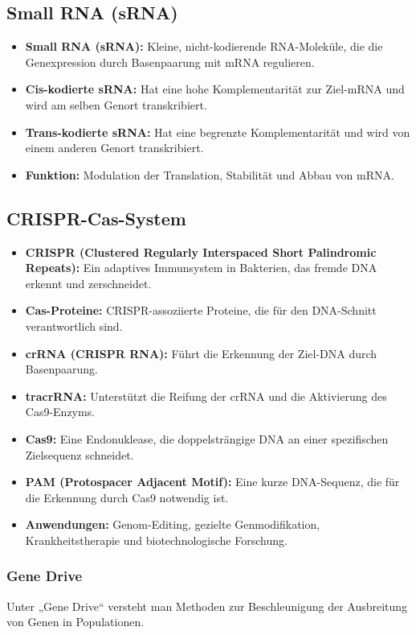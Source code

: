 \subsection{Small RNA (sRNA)}
\begin{itemize}
    \item \textbf{Small RNA (sRNA):} Kleine, nicht-kodierende RNA-Moleküle, die die Genexpression durch Basenpaarung mit mRNA regulieren.
    \item \textbf{Cis-kodierte sRNA:} Hat eine hohe Komplementarität zur Ziel-mRNA und wird am selben Genort transkribiert.
    \item \textbf{Trans-kodierte sRNA:} Hat eine begrenzte Komplementarität und wird von einem anderen Genort transkribiert.
    \item \textbf{Funktion:} Modulation der Translation, Stabilität und Abbau von mRNA. 
\end{itemize}
\subsection{CRISPR-Cas-System} 
\begin{itemize}
    \item \textbf{CRISPR (Clustered Regularly Interspaced Short Palindromic Repeats):} Ein adaptives Immunsystem in Bakterien, das fremde DNA erkennt und zerschneidet.
    \item \textbf{Cas-Proteine:} CRISPR-assoziierte Proteine, die für den DNA-Schnitt verantwortlich sind.
    \item \textbf{crRNA (CRISPR RNA):} Führt die Erkennung der Ziel-DNA durch Basenpaarung.
    \item \textbf{tracrRNA:} Unterstützt die Reifung der crRNA und die Aktivierung des Cas9-Enzyms.
    \item \textbf{Cas9:} Eine Endonuklease, die doppelsträngige DNA an einer spezifischen Zielsequenz schneidet.
    \item \textbf{PAM (Protospacer Adjacent Motif):} Eine kurze DNA-Sequenz, die für die Erkennung durch Cas9 notwendig ist.
    \item \textbf{Anwendungen:} Genom-Editing, gezielte Genmodifikation, Krankheitstherapie und biotechnologische Forschung.
\end{itemize}
\subsubsection{Gene Drive}
Unter „Gene Drive“ versteht man Methoden zur Beschleunigung der Ausbreitung von Genen in Populationen.
